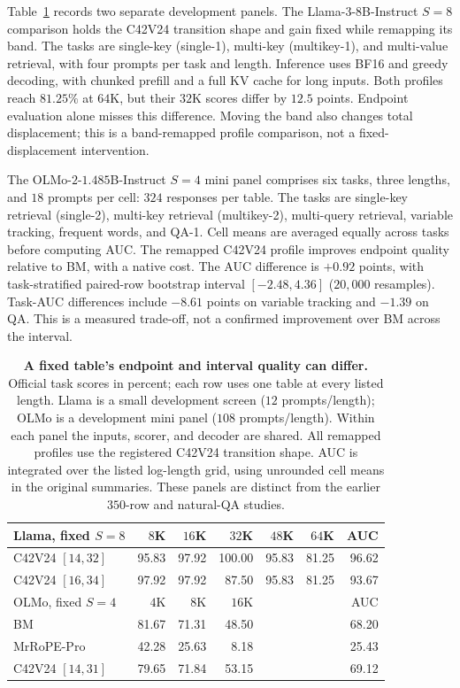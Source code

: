 Table~\ref{tab:interval-development} records two separate development panels. The Llama-$3$-$8$B-Instruct $S=8$ comparison holds the C42V24 transition shape and gain fixed while remapping its band. The tasks are single-key (single-1), multi-key (multikey-1), and multi-value retrieval, with four prompts per task and length. Inference uses BF16 and greedy decoding, with chunked prefill and a full KV cache for long inputs. Both profiles reach $81.25\%$ at $64$K, but their $32$K scores differ by $12.5$ points. Endpoint evaluation alone misses this difference. Moving the band also changes total displacement; this is a band-remapped profile comparison, not a fixed-displacement intervention.

The OLMo-$2$-$1.485$B-Instruct $S=4$ mini panel comprises six tasks, three lengths, and $18$ prompts per cell: $324$ responses per table. The tasks are single-key retrieval (single-2), multi-key retrieval (multikey-2), multi-query retrieval, variable tracking, frequent words, and QA-1. Cell means are averaged equally across tasks before computing AUC. The remapped C42V24 profile improves endpoint quality relative to BM, with a native cost. The AUC difference is $+0.92$ points, with task-stratified paired-row bootstrap interval $[-2.48,4.36]$ ($20{,}000$ resamples). Task-AUC differences include $-8.61$ points on variable tracking and $-1.39$ on QA. This is a measured trade-off, not a confirmed improvement over BM across the interval.

\begin{table}[t]
\centering\small
\caption{\textbf{A fixed table's endpoint and interval quality can differ.} Official task scores in percent; each row uses one table at every listed length. Llama is a small development screen ($12$ prompts/length); OLMo is a development mini panel ($108$ prompts/length). Within each panel the inputs, scorer, and decoder are shared. All remapped profiles use the registered C42V24 transition shape. AUC is integrated over the listed log-length grid, using unrounded cell means in the original summaries. These panels are distinct from the earlier $350$-row and natural-QA studies.}
\label{tab:interval-development}
\begin{tabular}{@{}lrrrrrr@{}}
\toprule
Llama, fixed $S=8$ & $8$K & $16$K & $32$K & $48$K & $64$K & AUC\\
\midrule
C42V24 $[14,32]$ &95.83&97.92&100.00&95.83&81.25&96.62\\
C42V24 $[16,34]$ &97.92&97.92&87.50&95.83&81.25&93.67\\
\midrule
OLMo, fixed $S=4$ & $4$K & $8$K & $16$K & & & AUC\\
\midrule
BM &81.67&71.31&48.50&&&68.20\\
MrRoPE-Pro &42.28&25.63&8.18&&&25.43\\
C42V24 $[14,31]$ &79.65&71.84&53.15&&&69.12\\
\bottomrule
\end{tabular}
\end{table}

